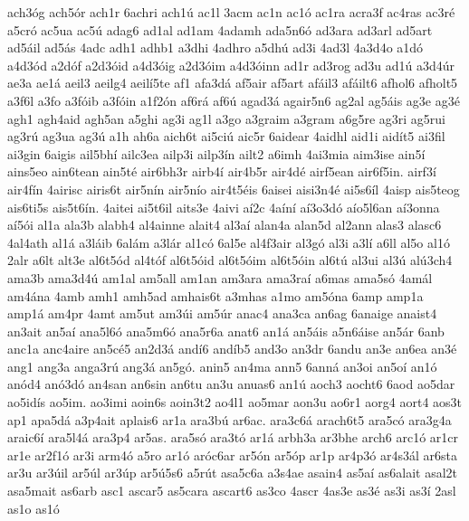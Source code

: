 {ach3^^f3g
ach5^^f3r
ach1r
6achri
ach1^^fa
ac1l
3acm
ac1n
ac1^^f3
ac1ra
acra3f
ac4ras
ac3r^^e9
a5cr^^f3
ac5ua
ac5^^fa
adag6
ad1al
ad1am
4adamh
ada5n6^^f3
ad3ara
ad3arl
ad5art
ad5^^e1il
ad5^^e1s
4adc
adh1
adhb1
a3dhi
4adhro
a5dh^^fa
ad3i
4ad3l
4a3d4o
a1d^^f3
a4d3^^f3d
a2d^^f3f
a2d3^^f3id
a4d3^^f3ig
a2d3^^f3im
a4d3^^f3inn
ad1r
ad3rog
ad3u
ad1^^fa
a3d4^^far
ae3a
ae1^^e1
aeil3
aeilg4
aeil^^ed5te
af1
afa3d^^e1
af5air
af5art
af^^e1il3
af^^e1ilt6
afhol6
afholt5
a3f6l
a3fo
a3f^^f3ib
a3f^^f3in
a1f2^^f3n
af6r^^e1
af6^^fa
agad3^^e1
agair5n6
ag2al
ag5^^e1is
ag3e
ag3^^e9
agh1
agh4aid
agh5an
a5ghi
ag3i
ag1l
a3go
a3graim
a3gram
a6g5re
ag3ri
ag5rui
ag3r^^fa
ag3ua
ag3^^fa
a1h
ah6a
aich6t
ai5ci^^fa
aic5r
6aidear
4aidhl
aid1i
aid^^edt5
ai3fil
ai3gin
6aigis
ail5bh^^ed
ailc3ea
ailp3i
ailp3^^edn
ailt2
a6imh
4ai3mia
aim3ise
ain5^^ed
ains5eo
ain6tean
ain5t^^e9
air6bh3r
airb4^^ed
air4b5r
air4d^^e9
airf5ean
air6f5in.
airf3^^ed
air4f^^edn
4airisc
airis6t
air5n^^edn
air5n^^edo
air4t5^^e9is
6aisei
aisi3n4^^e9
ai5s6^^edl
4aisp
ais5teog
ais6ti5s
ais5t6^^edn.
4aitei
ai5t6il
aits3e
4aivi
a^^ed2c
4a^^edn^^ed
a^^ed3o3d^^f3
a^^edo5l6an
a^^ed3onna
a^^ed5^^f3i
al1a
ala3b
alabh4
al4ainne
alait4
al3a^^ed
alan4a
alan5d
al2ann
alas3
alasc6
4al4ath
al1^^e1
a3l^^e1ib
6al^^e1m
a3l^^e1r
al1c^^f3
6al5e
al4f3air
al3g^^f3
al3i
a3l^^ed
a6ll
al5o
al1^^f3
2alr
a6lt
alt3e
al6t5^^f3d
al4t^^f3f
al6t5^^f3id
al6t5^^f3im
al6t5^^f3in
al6t^^fa
al3ui
al3^^fa
al^^fa3ch4
ama3b
ama3d4^^fa
am1al
am5all
am1an
am3ara
ama3ra^^ed
a6mas
ama5s^^f3
4am^^e1l
am4^^e1na
4amb
amh1
amh5ad
amhais6t
a3mhas
a1mo
am5^^f3na
6amp
amp1a
amp1^^e1
am4pr
4amt
am5ut
am3^^fai
am5^^far
anac4
ana3ca
an6ag
6anaige
anaist4
an3ait
an5a^^ed
ana5l6^^f3
ana5m6^^f3
ana5r6a
anat6
an1^^e1
an5^^e1is
a5n6^^e1ise
an5^^e1r
6anb
anc1a
anc4aire
an5c^^e95
an2d3^^e1
and^^ed6
and^^edb5
and3o
an3dr
6andu
an3e
an6ea
an3^^e9
ang1
ang3a
anga3r^^fa
ang3^^e1
an5g^^f3.
anin5
an4ma
ann5
6ann^^e1
an3oi
an5o^^ed
an1^^f3
an^^f3d4
an^^f33d^^f3
an4san
an6sin
an6tu
an3u
anuas6
an1^^fa
aoch3
aocht6
6aod
ao5dar
ao5id^^eds
ao5im.
ao3imi
aoin6s
aoin3t2
ao4l1
ao5mar
aon3u
ao6r1
aorg4
aort4
aos3t
ap1
apa5d^^e1
a3p4ait
aplais6
ar1a
ara3b^^fa
ar6ac.
ara3c6^^e1
arach6t5
ara5c^^f3
ara3g4a
araic6^^ed
ara5l4^^e1
ara3p4
ar5as.
ara5s^^f3
ara3t^^f3
ar1^^e1
arbh3a
ar3bhe
arch6
arc1^^f3
ar1cr
ar1e
ar2f1^^f3
ar3i
arm4^^f3
a5ro
ar1^^f3
ar^^f3c6ar
ar5^^f3n
ar5^^f3p
ar1p
ar4p3^^f3
ar4s3^^e1l
ar6sta
ar3u
ar3^^fail
ar5^^fal
ar3^^fap
ar5^^fa5s6
a5r^^fat
asa5c6a
a3s4ae
asain4
as5a^^ed
as6alait
asal2t
asa5mait
as6arb
asc1
ascar5
as5cara
ascart6
as3co
4ascr
4as3e
as3^^e9
as3i
as3^^ed
2asl
as1o
as1^^f3
}
